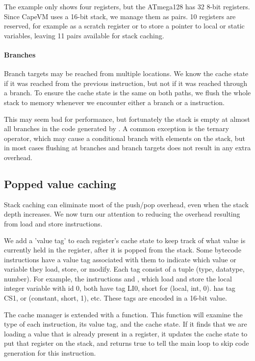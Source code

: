 The example only shows four registers, but the ATmega128 has 32 8-bit registers. Since CapeVM uses a 16-bit stack, we manage them as pairs. 10 registers are reserved, for example as a scratch register or to store a pointer to local or static variables, leaving 11 pairs available for stack caching.

\paragraph{Branches} Branch targets may be reached from multiple locations. We know the cache state if it was reached from the previous instruction, but not if it was reached through a branch. To ensure the cache state is the same on both paths, we flush the whole stack to memory whenever we encounter either a branch or a  instruction. 

This may seem bad for performance, but fortunately the stack is empty at almost all branches in the code generated by . A common exception is the ternary  operator, which may cause a conditional branch with elements on the stack, but in most cases flushing at branches and branch targets does not result in any extra overhead.

\subsection{Popped value caching}
\label{sec-optimisations-popped-value-caching}


Stack caching can eliminate most of the push/pop overhead, even when the stack depth increases. We now turn our attention to reducing the overhead resulting from load and store instructions.


We add a 'value tag' to each register's cache state to keep track of what value is currently held in the register, after it is popped from the stack. Some bytecode instructions have a value tag associated with them to indicate which value or variable they load, store, or modify. Each tag consist of a tuple (type, datatype, number). For example, the instructions  and , which load and store the local integer variable with id 0, both have tag LI0, short for (local, int, 0).  has tag CS1, or (constant, short, 1), etc. These tags are encoded in a 16-bit value.

The cache manager is extended with a  function. This function will examine the type of each instruction, its value tag, and the cache state. If it finds that we are loading a value that is already present in a register, it updates the cache state to put that register on the stack, and returns true to tell the main loop to skip code generation for this instruction.

